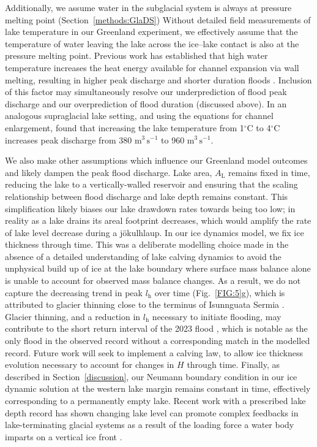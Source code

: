 \documentclass[tc, manuscript]{copernicus}
\begin{document}
 Additionally, we assume water in the subglacial system is always at pressure melting point (Section~\ref{methods:GlaDS}) Without detailed field measurements of lake temperature in our Greenland experiment, we effectively assume that the temperature of water leaving the lake across the ice--lake contact is also at the pressure melting point. Previous work \citep[e.g.,][]{clarke2003hydraulics,ng2007climatic,carrivick2017ice} has established that high water temperature increases the heat energy available for channel expansion via wall melting, resulting in higher peak discharge and shorter duration floods \citep[see Fig. 6A in][]{carrivick2017ice}. Inclusion of this factor may simultaneously resolve our underprediction of flood peak discharge and our overprediction of flood duration (discussed above). In an analogous supraglacial lake setting, and using the \citet{spring1981numerical} equations for channel enlargement, \citet{werder2010hazard} found that increasing the lake temperature from 1$^{\circ}$C to 4$^{\circ}$C increases peak discharge from 380 $\mathrm{m}^3 \, \mathrm{s}^{-1}$ to 960 $\mathrm{m}^3 \, \mathrm{s}^{-1}$. 

We also make other assumptions which influence our Greenland model outcomes and likely dampen the peak flood discharge. Lake area, $A_{\mathrm{L}}$ remains fixed in time, reducing the lake to a vertically-walled reservoir and ensuring that the scaling relationship between flood discharge and lake depth remains constant. This simplification likely biases our lake drawdown rates towards being too low; in reality as a lake drains its areal footprint decreases, which would amplify the rate of lake level decrease during a jökulhlaup. In our ice dynamics model, we fix ice thickness through time. This was a deliberate modelling choice made in the absence of a detailed understanding of lake calving dynamics to avoid the unphysical build up of ice at the lake boundary where surface mass balance alone is unable to account for observed mass balance changes. As a result, we do not capture the decreasing trend in peak $l_{\mathrm{h}}$ over time (Fig.~\ref{FIG:5}g), which is attributed to glacier thinning close to the terminus of Isunnguata Sermia \citep{livingstone2025ice}. Glacier thinning, and a reduction in $l_{\mathrm{h}}$ necessary to initiate flooding, may contribute to the short return interval of the 2023 flood \citep{livingstone2025ice}, which is notable as the only flood in the observed record without a corresponding match in the modelled record. Future work will seek to implement a calving law, to allow ice thickness evolution necessary to account for changes in $H$ through time. Finally, as described in Section~\ref{discussion}, our Neumann boundary condition in our ice dynamic solution at the western lake margin remains constant in time, effectively corresponding to a permanently empty lake. Recent work with a prescribed lake depth record has shown changing lake level can promote complex feedbacks in lake-terminating glacial systems as a result of the loading force a water body imparts on a vertical ice front \citep{pramanik2026modelling}. 
\end{document}
